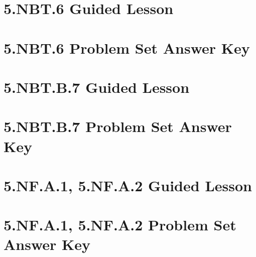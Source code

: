 \documentclass[a4paper,12pt]{article}
\begin{document}
\newpage
\section{5.NBT.6 Guided Lesson}


\newpage
\section{5.NBT.6 Problem Set Answer Key}


\newpage
\section{5.NBT.B.7 Guided Lesson}


\newpage
\section{5.NBT.B.7 Problem Set Answer Key}


\newpage
\section{5.NF.A.1, 5.NF.A.2 Guided Lesson}


\newpage
\section{5.NF.A.1, 5.NF.A.2 Problem Set Answer Key}

\end{document}
